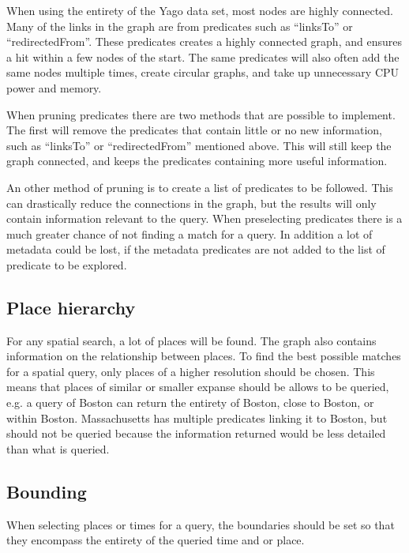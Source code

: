 When using the entirety of the Yago data set, most nodes are highly connected. Many of the links in the graph are from predicates such as ``linksTo'' or ``redirectedFrom''. These predicates creates a highly connected graph, and ensures a hit within a few nodes of the start. The same predicates will also often add the same nodes multiple times, create circular graphs, and take up unnecessary CPU power and memory.

When pruning predicates there are two methods that are possible to implement. The first will remove the predicates that contain little or no new information, such as ``linksTo'' or ``redirectedFrom'' mentioned above. This will still keep the graph connected, and keeps the predicates containing more useful information.

An other method of pruning is to create a list of predicates to be followed. This can drastically reduce the connections in the graph, but the results will only contain information relevant to the query. When preselecting predicates there is a much greater chance of not finding a match for a query. In addition a lot of metadata could be lost, if the metadata predicates are not added to the list of predicate to be explored.

\subsection{Place hierarchy}
For any spatial search, a lot of places will be found. The graph also contains information on the relationship between places. To find the best possible matches for a spatial query, only places of a higher resolution should be chosen. This means that places of similar or smaller expanse should be allows to be queried, e.g. a query of Boston can return the entirety of Boston, close to Boston, or within Boston. Massachusetts has multiple predicates linking it to Boston, but should not be queried because the information returned would be less detailed than what is queried. 

\subsection{Bounding}
When selecting places or times for a query, the boundaries should be set so that they encompass the entirety of the queried time and or place.

\glsresetall


